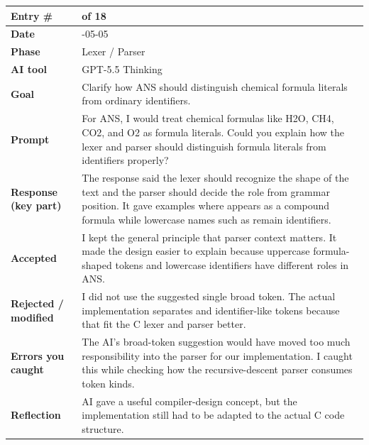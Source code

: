 \documentclass[11pt,a4paper]{article}
\newcommand{\code}[1]{\texttt{\detokenize{#1}}}
\newcommand{\entrygap}{\vspace{8pt}}
\newenvironment{journalentry}{%
  \begin{center}\small\renewcommand{\arraystretch}{1.22}%
  \begin{tabular}{|>{\columncolor{anscodebg}\bfseries}p{3.0cm}|>{\RaggedRight\arraybackslash}p{12.25cm}|}%
  \hline
}{%
  \end{tabular}\end{center}\entrygap
}
\begin{document}
\begin{journalentry}
Entry \# & 3 of 18 \\ \hline
Date & 2026-05-05 \\ \hline
Phase & Lexer / Parser \\ \hline
AI tool & GPT-5.5 Thinking \\ \hline
Goal & Clarify how ANS should distinguish chemical formula literals from ordinary identifiers. \\ \hline
Prompt & For ANS, I would treat chemical formulas like H2O, CH4, CO2, and O2 as formula literals. Could you explain how the lexer and parser should distinguish formula literals from identifiers properly? \\ \hline
Response (key part) & The response said the lexer should recognize the shape of the text and the parser should decide the role from grammar position. It gave examples where \code{H2O} appears as a compound formula while lowercase names such as \code{water} remain identifiers. \\ \hline
Accepted & I kept the general principle that parser context matters. It made the design easier to explain because uppercase formula-shaped tokens and lowercase identifiers have different roles in ANS. \\ \hline
Rejected / modified & I did not use the suggested single broad \code{WORD} token. The actual implementation separates \code{FORMULA} and identifier-like tokens because that fit the C lexer and parser better. \\ \hline
Errors you caught & The AI's broad-token suggestion would have moved too much responsibility into the parser for our implementation. I caught this while checking how the recursive-descent parser consumes token kinds. \\ \hline
Reflection & AI gave a useful compiler-design concept, but the implementation still had to be adapted to the actual C code structure. \\ \hline
\end{journalentry}
\end{document}
